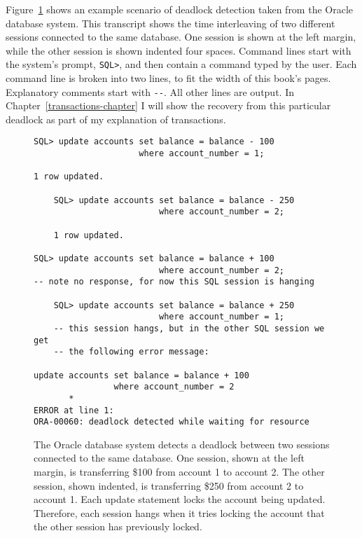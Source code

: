 Figure~\ref{oracle-deadlock} shows an example scenario of deadlock
detection taken from the Oracle database system.
This transcript shows the time interleaving of two
different sessions connected to the same database.  One session is
shown at the left margin, while the other session is shown indented
four spaces.  Command lines start with the system's prompt,
\texttt{SQL>}, and then contain a command typed by the user.  Each
command line is broken into two lines, to fit the width of this
book's pages.
Explanatory comments start with \texttt{-{}-}.  All other lines are
output.
In Chapter~\ref{transactions-chapter} I will show the recovery from this particular
deadlock as part of my explanation of transactions.
\begin{figure}
\begin{verbatim}
SQL> update accounts set balance = balance - 100
                     where account_number = 1;

1 row updated.

    SQL> update accounts set balance = balance - 250
                         where account_number = 2;

    1 row updated.

SQL> update accounts set balance = balance + 100 
                         where account_number = 2;
-- note no response, for now this SQL session is hanging

    SQL> update accounts set balance = balance + 250 
                         where account_number = 1;
    -- this session hangs, but in the other SQL session we get
    -- the following error message:

update accounts set balance = balance + 100 
                where account_number = 2
       *
ERROR at line 1:
ORA-00060: deadlock detected while waiting for resource 
\end{verbatim}
\caption{The Oracle database
  system detects a deadlock between two sessions connected to the same
  database.  One session, shown at the left margin, is transferring \$100
  from account 1 to account 2.  The other session, shown indented, is
  transferring \$250 from account 2 to account 1.  Each update statement
  locks the account being updated.  Therefore, each session hangs when it
  tries locking the account that the other session has previously locked.}
\label{oracle-deadlock}
\end{figure}

